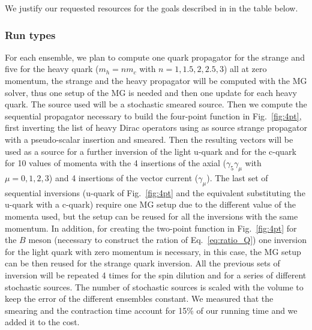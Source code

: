 

We justify our requested resources for the goals described
in  in the table below.

\subsubsection{Run types \label{sec:runtypes}}


For each ensemble, we plan to compute  one quark propagator for the strange
and five for the heavy quark ($m_h=n m_c$ with $n=1, 1.5, 2, 2.5, 3$) all at zero momentum, the strange and the heavy propagator 
will be computed with the MG solver, thus one setup of the MG is needed and then one update for each 
heavy quark. 
The source used will be a stochastic smeared source.
Then we compute the sequential propagator necessary to build the four-point function in Fig.~\ref{fig:4pt},
first inverting the list of heavy Dirac operators using as source strange propagator with a pseudo-scalar
insertion and smeared. Then the resulting vectors will be used as a source for a further inversion of the light u-quark and for the c-quark for 10 values of momenta with the 4 insertions of the axial ($\gamma_5\gamma_\mu$ with $\mu=0,1,2,3$) and 4 insertions of the vector current ($\gamma_\mu$). The last set of sequential inversions (u-quark of Fig.~\ref{fig:4pt} and the equivalent substituting the u-quark with a c-quark) require one MG setup due to the different value of the momenta used, but the setup can be reused for all the inversions with the same momentum.
In addition, for creating the two-point function in Fig.~\ref{fig:4pt} for the $B$ meson (necessary to construct the ration of Eq.~\ref{eq:ratio_Q}) one
inversion for the light quark with zero momentum is necessary, in this case, the MG setup can be then reused for the strange quark inversion.
All the previous sets of inversion will be repeated 4 times for the spin dilution and for a series of different stochastic sources.
The number of stochastic sources is scaled with the volume to keep the error of the different ensembles constant. We measured that the smearing and the contraction time account for 15\% of our running time and we added it to the cost.

